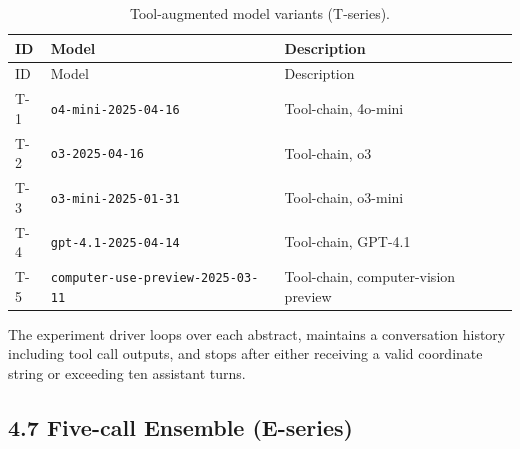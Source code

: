 \begin{longtable}[]{@{}
  >{\raggedright\arraybackslash}p{}
  >{\raggedright\arraybackslash}p{}
  >{\raggedright\arraybackslash}p{}@{}}
\caption{\label{tbl:tmodels}Tool-augmented model variants
(T-series).}\tabularnewline
\toprule\noalign{}
\begin{minipage}[b]{\linewidth}\raggedright
ID
\end{minipage} & \begin{minipage}[b]{\linewidth}\raggedright
Model
\end{minipage} & \begin{minipage}[b]{\linewidth}\raggedright
Description
\end{minipage} \\
\midrule\noalign{}
\endfirsthead
\toprule\noalign{}
\begin{minipage}[b]{\linewidth}\raggedright
ID
\end{minipage} & \begin{minipage}[b]{\linewidth}\raggedright
Model
\end{minipage} & \begin{minipage}[b]{\linewidth}\raggedright
Description
\end{minipage} \\
\midrule\noalign{}
\endhead
\bottomrule\noalign{}
\endlastfoot
T-1 & \passthrough{\lstinline!o4-mini-2025-04-16!} & Tool-chain,
4o-mini \\
T-2 & \passthrough{\lstinline!o3-2025-04-16!} & Tool-chain, o3 \\
T-3 & \passthrough{\lstinline!o3-mini-2025-01-31!} & Tool-chain,
o3-mini \\
T-4 & \passthrough{\lstinline!gpt-4.1-2025-04-14!} & Tool-chain,
GPT-4.1 \\
T-5 & \passthrough{\lstinline!computer-use-preview-2025-03-11!} &
Tool-chain, computer-vision preview \\
\end{longtable}

The experiment driver loops over each abstract, maintains a conversation
history including tool call outputs, and stops after either receiving a
valid coordinate string or exceeding ten assistant turns.

\subsection{4.7 Five-call Ensemble
(E-series)}\label{five-call-ensemble-e-series}

